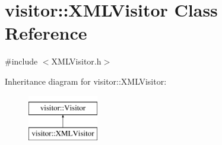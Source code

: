 \hypertarget{classvisitor_1_1XMLVisitor}{}\section{visitor\+:\+:X\+M\+L\+Visitor Class Reference}
\label{classvisitor_1_1XMLVisitor}


{\ttfamily \#include $<$X\+M\+L\+Visitor.\+h$>$}

Inheritance diagram for visitor\+:\+:X\+M\+L\+Visitor\+:\begin{figure}[H]
\begin{center}
\leavevmode
\includegraphics[height=2.000000cm]{d4/de3/classvisitor_1_1XMLVisitor}
\end{center}
\end{figure}
